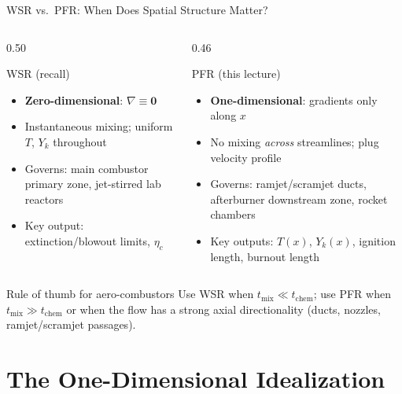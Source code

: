 \documentclass[12pt,aspectratio=169]{beamer}
\newcommand{\tchem}{t_{\text{chem}}}
\begin{document}
\begin{frame}{WSR vs.\ PFR: When Does Spatial Structure Matter?}

  \begin{columns}
    \begin{column}{0.50\textwidth}
      \begin{block}{WSR (recall)}
        \begin{itemize}
          \item \textbf{Zero-dimensional}: $\nabla \equiv \mathbf{0}$
          \item Instantaneous mixing; uniform $T$, $Y_k$ throughout
          \item Governs: main combustor primary zone,
                jet-stirred lab reactors
          \item Key output: extinction/blowout limits, $\eta_c$
        \end{itemize}
      \end{block}
    \end{column}
    \begin{column}{0.46\textwidth}
      \begin{alertblock}{PFR (this lecture)}
        \begin{itemize}
          \item \textbf{One-dimensional}: gradients only along $x$
          \item No mixing \emph{across} streamlines; plug velocity profile
          \item Governs: ramjet/scramjet ducts, afterburner
                downstream zone, rocket chambers
          \item Key outputs: $T(x)$, $Y_k(x)$, ignition length,
                burnout length
        \end{itemize}
      \end{alertblock}
    \end{column}
  \end{columns}

  \begin{exampleblock}{Rule of thumb for aero-combustors}
    Use WSR when $t_{\text{mix}} \ll \tchem$; use PFR when
    $t_{\text{mix}} \gg \tchem$ or when the flow has a strong axial
 directionality (ducts, nozzles, ramjet/scramjet passages).
  \end{exampleblock}
\end{frame}

\section{The One-Dimensional Idealization}
\end{document}
